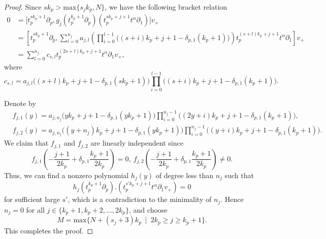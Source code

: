 \documentclass[10pt,a4paper]{amsart}
\begin{document}
\begin{proof}
	Since $sk_p> \text{max}\{s_{j}k_p,N\} $, we have the following bracket relation 
	\begin{align*}
	0 &=\big[t_{p}^{sk_p + 1}\partial_{p},g_{j}(t_{p}^{k_p + 1}\partial_{p})(t_{p}^{sk_p + j + 1}t^{\alpha}\partial_{1})\big]v_+\\
	&=\left[t_{p}^{sk_p + 1}\partial_{p},\sum_{l=0}^{n_{j}}a_{j,l}\left(\prod_{i=0}^{l-1}\big((s+i)k_p+j+1-\delta_{p,1}(k_p+1)\big) \right )t_p^{(s+l)k_p+j+1}t^{\alpha}\partial_1\right]v_+\\
	&=\sum_{l=0}^{n_{j}}c_{s,l}t_p^{(2s+l)k_p+j+1}t^{\alpha}\partial_1v_+,
\end{align*}
where
\begin{equation*}
	c_{s,l}=a_{j,l}\big((s+l)k_p+j+1-\delta_{p,1}(sk_p+1)\big)\prod_{i=0}^{l-1}\big((s+i)k_p+j+1-\delta_{p,1}(k_p+1)\big).
\end{equation*}
	
		Denote by
	\begin{align*}
		&f_{j,1}(y)=a_{j,n_j}\big(yk_p+j+1-\delta_{p,1}(yk_p+1)\big)\prod_{i=0}^{n_{j}-1}\big((2y+i)k_p+j+1-\delta_{p,1}(k_p+1)\big),\\
		&f_{j,2}(y)=a_{j,n_j}\big((y+n_j)k_p+j+1-\delta_{p,1}(yk_p+1)\big)\prod_{i=0}^{n_{j}-1}\big((y+i)k_p+j+1-\delta_{p,1}(k_p+1)\big).
	\end{align*}
	We claim that $f_{j,1}$ and $f_{j,2}$ are linearly independent since
\begin{equation*}
	f_{j,1}\left(-\frac{j+1}{2k_p}+\delta_{p,1}\frac{k_p+1}{2k_p}\right)=0,~	f_{j,2}\left(-\frac{j+1}{2k_p}+\delta_{p,1}\frac{k_p+1}{2k_p}\right)\neq0.
\end{equation*}
	Thus, we can find a nonzero polynomial $h_{j}(y)$ of degree less than $n_{j}$ such that
	\[h_{j}(t_{p}^{k_p+1}\partial_{p}).(t_{p}^{s'k_p+j+1}t^{\alpha}\partial_{1}v_+)=0\]
	for sufficient large $s'$, which is a contradiction to the minimality of $n_{j}$. Hence $n_{j}=0$ for all
	$j\in\{k_p+1,k_p+2,\dots,2k_p\}$, and choose 
	\begin{equation*} 
		M=\text{max}\{N+(s_j+3)k_p \ \mid \  2k_p \geq  j \geq k_p+1 \}.
	\end{equation*}This completes the proof.
\end{proof}
\end{document}
